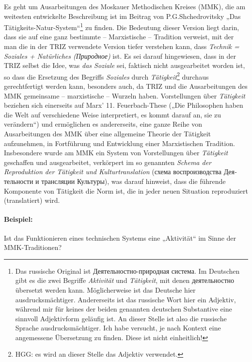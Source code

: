 \documentclass[11pt,a4paper]{article}
\begin{document}
Es geht um Ausarbeitungen des Moskauer Methodischen Kreises (MMK), die am
weitesten entwickelte Beschreibung ist im Beitrag von P.G.Shchedrovitsky „Das
Tätigkeits-Natur-System“\footnote{Das russische Original ist
  \foreignlanguage{russian}{Деятельностно-природная система}. Im Deutschen
  gibt es die zwei Begriffe \emph{Aktivität} und \emph{Tätigkeit}, mit denen
  \foreignlanguage{russian}{деятельностно} übersetzt werden kann.
  Möglicherweise ist das Deutsche hier ausdrucksmächtiger.  Andererseits ist
  das russische Wort hier ein Adjektiv, während mir für keines der beiden
  genannten deutschen Substantive eine sinnvoll Adjektivform geläufig ist.  An
  dieser Stelle ist also die russische Sprache ausdrucksmächtiger.  Ich habe
  versucht, je nach Kontext eine angemessene Übersetzung zu finden.  Diese ist
  nicht einheitlich!} zu finden.  Die Bedeutung dieser Version liegt darin,
dass sie auf eine ganz bestimmte -- Marxistische -- Tradition verweist, mit
der man die in der TRIZ verwendete Version tiefer verstehen kann, dass
\emph{Technik = Soziales + Natürliches (\foreignlanguage{russian}{Природное})}
ist.  Es sei darauf hingewiesen, dass in der TRIZ selbst die Idee, was
\emph{das Soziale} sei, faktisch nicht ausgearbeitet worden ist, so dass die
Ersetzung des Begriffs \emph{Soziales} durch \emph{Tätigkeit}\footnote{HGG: es
  wird an dieser Stelle das Adjektiv verwendet.}  durchaus gerechtfertigt
werden kann, besonders auch, da TRIZ und die Ausarbeitungen des MMK gemeinsame
-- marxistische -- Wurzeln haben. Vorstellungen über \emph{Tätigkeit} beziehen
sich einerseits auf Marx' 11. Feuerbach-These („Die Philosophen haben die Welt
auf verschiedene Weise interpretiert, es kommt darauf an, sie zu verändern“)
und ermöglichen es andererseits, eine ganze Reihe von Ausarbeitungen des MMK
über eine allgemeine Theorie der Tätigkeit aufzunehmen, in Fortführung und
Entwicklung einer Marxistischen Tradition. Insbesondere wurde am MMK ein
System von Vorstellungen über \emph{Tätigkeit} geschaffen und ausgearbeitet,
verkörpert im so genannten \emph{Schema der Reproduktion der Tätigkeit und
  Kulturtranslation} (\foreignlanguage{russian}{схема воспроизводства
  Деятельности и трансляции Культуры}), was darauf hinweist, dass die führende
Komponente von Tätigkeit die Norm ist, die in jeder neuen Situation
reproduziert (translatiert) wird.

\paragraph{Beispiel:}
Ist das Funktionieren eines technischen Systems eine „Aktivität“ im Sinne der
MMK-Traditionen?
\end{document}
